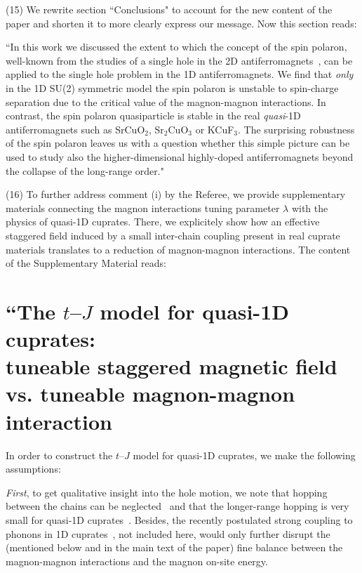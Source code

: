\documentclass[%
 manuscript,
 amsmath,amssymb,
 aps, onecolumn,
prl,
]{revtex4-1}
\begin{document}
(15) We rewrite section ``Conclusions" to account for the new content of the paper and shorten it to more clearly express our message. Now this section reads:

``In this work we discussed the extent to which the concept of the spin polaron, well-known from the studies of a single hole in the 2D antiferromagnets~\cite{Shr88}, can be applied to the single hole problem in the 1D antiferromagnets. We find that {\it only} in the 1D SU(2) symmetric model the spin polaron is unstable to spin-charge separation due to the critical value of the magnon-magnon interactions. In contrast, the spin polaron quasiparticle is stable in the real {\it quasi}-1D antiferromagnets such as SrCuO$_2$, Sr$_2$CuO$_3$ or KCuF$_3$. The surprising robustness of the spin polaron leaves us with a question whether this simple picture can be used to study also the higher-dimensional highly-doped antiferromagnets beyond the collapse of the long-range order."

(16) To further address comment (i) by the Referee, we provide supplementary materials connecting the magnon interactions tuning parameter $\lambda$ with the physics of quasi-1D cuprates. There, we explicitely show how an effective staggered field induced by a small inter-chain coupling present in real cuprate materials translates to a reduction of magnon-magnon interactions. The content of the Supplementary Material reads:

\section{``The $t$--$J$ model for quasi-1D cuprates:\\ tuneable staggered magnetic field vs. tuneable magnon-magnon interaction}

In order to construct the $t$--$J$ model for quasi-1D cuprates, we make the following assumptions:

{\it First}, to get qualitative insight into the hole motion, we note that hopping between the chains can 
be neglected~\cite{Gru18b} and that the longer-range hopping is
very small for quasi-1D cuprates~\cite{Li2021}. Besides, the recently postulated strong coupling to phonons in 1D cuprates~\cite{Chen2021}, not included here, would only further 
disrupt the (mentioned below and in the main text of the paper) fine balance between the magnon-magnon interactions and the magnon on-site energy.
\end{document}
